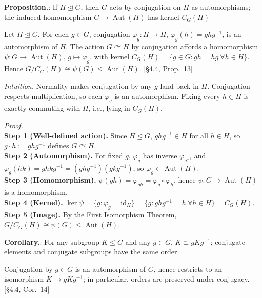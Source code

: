 \documentclass[12pt]{article}
\theoremstyle{definition}
\newcommand{\Aut}{\operatorname{Aut}}
\begin{document}
\newpage


\noindent\textbf{Proposition.}: If $H\trianglelefteq G$, then $G$ acts by conjugation on $H$ as automorphisms; the induced homomorphism $G\to \Aut(H)$ has kernel $C_G(H)$

\newpage

Let $H\trianglelefteq G$. For each $g\in G$, conjugation $\varphi_g\!:H\to H$, $\varphi_g(h)=ghg^{-1}$, is an automorphism of $H$. The action $G\curvearrowright H$ by conjugation affords a homomorphism $\psi:G\to \Aut(H)$, $g\mapsto \varphi_g$, with kernel $C_G(H)=\{g\in G:gh=hg\ \forall h\in H\}$. Hence $G/C_G(H)\cong \psi(G)\le \Aut(H)$. \hfill {\footnotesize [§4.4, Prop.~13]}\\

\dotfill

\emph{Intuition.} Normality makes conjugation by any $g$ land back in $H$. Conjugation respects multiplication, so each $\varphi_g$ is an automorphism. Fixing every $h\in H$ is exactly commuting with $H$, i.e., lying in $C_G(H)$.

\dotfill

\emph{Proof.}\\
\textbf{Step 1 (Well-defined action).} Since $H\trianglelefteq G$, $ghg^{-1}\in H$ for all $h\in H$, so $g\cdot h:=ghg^{-1}$ defines $G\curvearrowright H$.\\
\textbf{Step 2 (Automorphism).} For fixed $g$, $\varphi_g$ has inverse $\varphi_{g^{-1}}$ and $\varphi_g(hk)=ghkg^{-1}=(ghg^{-1})(gkg^{-1})$, so $\varphi_g\in\Aut(H)$.\\
\textbf{Step 3 (Homomorphism).} $\psi(gh)=\varphi_{gh}=\varphi_g\circ\varphi_h$, hence $\psi:G\to\Aut(H)$ is a homomorphism.\\
\textbf{Step 4 (Kernel).} $\ker\psi=\{g:\varphi_g=\mathrm{id}_H\}=\{g:ghg^{-1}=h\ \forall h\in H\}=C_G(H)$.\\
\textbf{Step 5 (Image).} By the First Isomorphism Theorem, $G/C_G(H)\cong \psi(G)\le \Aut(H)$.\\

\newpage


\noindent\textbf{Corollary.}: For any subgroup $K\le G$ and any $g\in G$, $K\cong gKg^{-1}$; conjugate elements and conjugate subgroups have the same order

\newpage

Conjugation by $g\in G$ is an automorphism of $G$, hence restricts to an isomorphism $K\to gKg^{-1}$; in particular, orders are preserved under conjugacy. \hfill {\footnotesize [§4.4, Cor.~14]}\\
\end{document}
